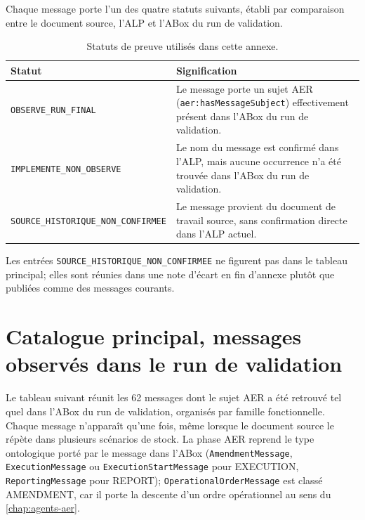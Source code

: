 Chaque message porte l'un des quatre statuts suivants, établi par comparaison entre le document source, l'ALP et l'ABox du run de validation.

\begin{table}[H]
  \centering
  \begin{tabularx}{\textwidth}{L{0.30\textwidth} Y}
    \toprule
    Statut & Signification \\
    \midrule
    \texttt{OBSERVE\_\allowbreak RUN\_\allowbreak FINAL} & Le message porte un sujet AER (\texttt{aer:has\allowbreak Message\allowbreak Subject}) effectivement présent dans l'ABox du run de validation. \\
    \texttt{IMPLEMENTE\_\allowbreak NON\_\allowbreak OBSERVE} & Le nom du message est confirmé dans l'ALP, mais aucune occurrence n'a été trouvée dans l'ABox du run de validation. \\
    \texttt{SOURCE\_\allowbreak HISTORIQUE\_\allowbreak NON\_\allowbreak CONFIRMEE} & Le message provient du document de travail source, sans confirmation directe dans l'ALP actuel. \\
    \bottomrule
  \end{tabularx}
  \caption{Statuts de preuve utilisés dans cette annexe.}
  \label{tab:statuts-messages}
\end{table}

Les entrées \texttt{SOURCE\_\allowbreak HISTORIQUE\_\allowbreak NON\_\allowbreak CONFIRMEE} ne figurent pas dans le tableau principal; elles sont réunies dans une note d'écart en fin d'annexe plutôt que publiées comme des messages courants.

\section{Catalogue principal, messages observés dans le run de validation}

Le tableau suivant réunit les 62 messages dont le sujet AER a été retrouvé tel quel dans l'ABox du run de validation, organisés par famille fonctionnelle. Chaque message n'apparaît qu'une fois, même lorsque le document source le répète dans plusieurs scénarios de stock. La phase AER reprend le type ontologique porté par le message dans l'ABox (\texttt{Amendment\allowbreak Message}, \texttt{Execution\allowbreak Message} ou \texttt{Execution\allowbreak Start\allowbreak Message} pour EXECUTION, \texttt{Reporting\allowbreak Message} pour REPORT); \texttt{Operational\allowbreak Order\allowbreak Message} est classé AMENDMENT, car il porte la descente d'un ordre opérationnel au sens du \cref{chap:agents-aer}.

